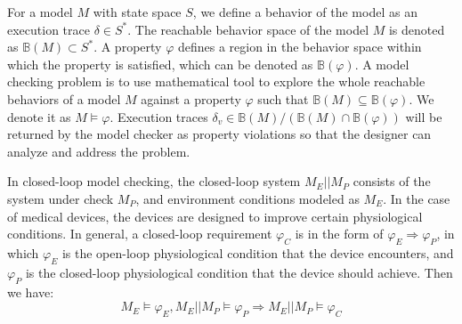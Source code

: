 %
For a model $M$ with state space $S$, we define a behavior of the model as an execution trace $\delta\in S^*$. The reachable behavior space of the model $M$ is denoted as $\mathbb{B}(M)\subset S^*$. A property $\varphi$ defines a region in the behavior space within which the property is satisfied, which can be denoted as $\mathbb{B}(\varphi)$. A model checking problem is to use mathematical tool to explore the whole reachable behaviors of a model $M$ against a property $\varphi$ such that $\mathbb{B}(M)\subseteq \mathbb{B}(\varphi)$. We denote it as $M\models\varphi$. Execution traces $\delta_v\in\mathbb{B}(M)/(\mathbb{B}(M)\cap\mathbb{B}(\varphi))$ will be returned by the model checker as property violations so that the designer can analyze and address the problem. 

In closed-loop model checking, the closed-loop system $M_E||M_P$ consists of the system under check $M_P$, and environment conditions modeled as $M_E$. In the case of medical devices, the devices are designed to improve certain physiological conditions. In general, a closed-loop requirement $\varphi_C$ is in the form of $\varphi_E\Rightarrow \varphi_P$, in which $\varphi_E$ is the open-loop physiological condition that the device encounters, and $\varphi_P$ is the closed-loop physiological condition that the device should achieve. Then we have:
 \begin{equation}\label{req_def}
M_E\models\varphi_E, M_E||M_P\models \varphi_P\Rightarrow M_E||M_P\models\varphi_C
\end{equation}

